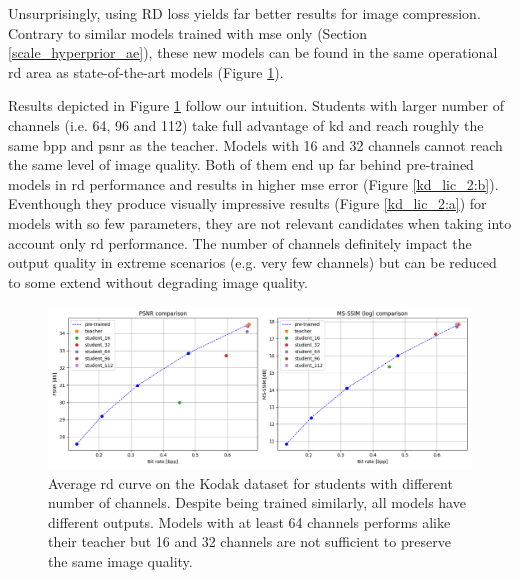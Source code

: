 Unsurprisingly, using \acrshort{RD} loss yields far better results for image compression. Contrary to similar models trained with \acrshort{mse} only (Section \ref{scale_hyperprior_ae}), these new models can be found in the same operational \acrshort{rd} area as state-of-the-art models (Figure \ref{kd_lic_1}).

Results depicted in Figure \ref{kd_lic_1} follow our intuition. Students with larger number of channels (i.e. 64, 96 and 112) take full advantage of \acrshort{kd} and reach roughly the same \acrshort{bpp} and \acrshort{psnr} as the teacher. Models with 16 and 32 channels cannot reach the same level of image quality. Both of them end up far behind pre-trained models in \acrshort{rd} performance and results in higher \acrshort{mse} error (Figure \ref{kd_lic_2:b}). Eventhough they produce visually impressive results (Figure \ref{kd_lic_2:a}) for models with so few parameters, they are not relevant candidates when taking into account only \acrshort{rd} performance. The number of channels definitely impact the output quality in extreme scenarios (e.g. very few channels) but can be reduced to some extend without degrading image quality.

\begin{figure}
    \centering
    \includegraphics[width=15cm]{../img/kd_lic_rd_channels.png}
    \caption[Average \acrshort{rd} curve on the Kodak dataset for students with different number of channels.]{Average \acrshort{rd} curve on the Kodak dataset for students with different number of channels. Despite being trained similarly, all models have different outputs. Models with at least 64 channels performs alike their teacher but 16 and 32 channels are not sufficient to preserve the same image quality.}
    \label{kd_lic_1}
\end{figure}

